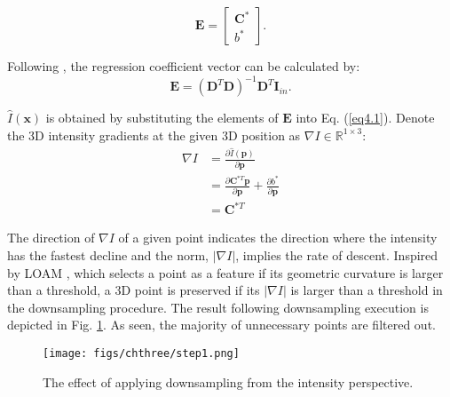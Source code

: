 \begin{equation}	
\mathbf{E} = \left[\begin{array}{c}  \mathbf{C}^{*}  \\ 
b^{*}
   \end{array}\right].
\end{equation} \par
Following \cite{barfoot}, the regression coefficient vector can be calculated by:
\begin{equation}	
\mathbf{E} =(\mathbf{D}^{T}\mathbf{D})^{-1}\mathbf{D}^{T}\mathbf{I}_{in}.
\end{equation} \par
$\hat{I}(\mathbf{x})$ is obtained by substituting the elements of $\mathbf{E}$ into Eq. (\ref{eq4.1}). Denote the 3D intensity gradients at the given 3D position as 
$\nabla I \in \mathbb{R}^{1 \times 3}$:
\begin{equation}
\begin{aligned}
 \nabla I &= \frac{\partial \hat{I}(\mathbf{p})}{\partial \mathbf{p}}\\
 &=\frac{\partial \mathbf{C}^{* T}\mathbf{p}}{\partial \mathbf{p}} + \frac{\partial b^{*}}{\partial \mathbf{p}}\\
 &=\mathbf{C}^{* T}
 \end{aligned}
\end{equation} \par

The direction of $\nabla I$  of a given point indicates the direction where the intensity has the fastest decline and the norm, $|\nabla I|$, implies the rate of descent. 
%
Inspired by LOAM \cite{loam}, which selects a point as a feature if its geometric curvature is larger than a threshold, a 3D point is preserved if its $|\nabla I|$ is larger than a threshold in the downsampling procedure. The result following downsampling execution is depicted in Fig. \ref{step1}. As seen, the majority of unnecessary points are filtered out.\par
\begin{figure}[H] 
	\centering
\texttt{[image: figs/chthree/step1.png]}
	\caption{The effect of applying downsampling from the intensity perspective.}
	\label{step1}
\end{figure}\par


